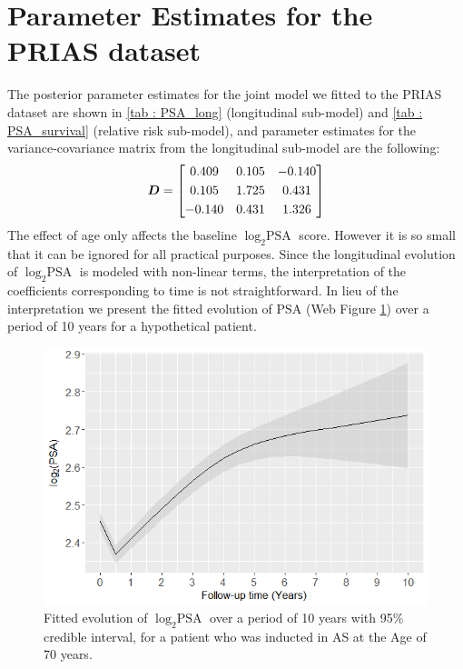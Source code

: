 
\section{Parameter Estimates for the PRIAS dataset}
\label{sec : param_estimates_jm_fit_prias}
The posterior parameter estimates for the joint model we fitted to the PRIAS dataset are shown in \ref{tab : PSA_long} (longitudinal sub-model) and \ref{tab : PSA_survival} (relative risk sub-model), and parameter estimates for the variance-covariance matrix from the longitudinal sub-model are the following:
\begin{equation*}
\boldsymbol{D} = \begin{bmatrix}
       0.409 & 0.105 & -0.140 \\[0.3em]
       0.105 & 1.725 & 0.431 \\[0.3em]
       -0.140 & 0.431 & 1.326
     \end{bmatrix}
\end{equation*} 
The effect of age only affects the baseline $\log_2 \mbox{PSA}$ score. However it is so small that it can be ignored for all practical purposes. Since the longitudinal evolution of $\log_2 \mbox{PSA}$ is modeled with non-linear terms, the interpretation of the coefficients corresponding to time is not straightforward. In lieu of the interpretation we present the fitted evolution of PSA (Web Figure \ref{fig : fitted_trend_psa}) over a period of 10 years for a hypothetical patient.

\begin{figure}[!htb]
\centerline{\includegraphics[width=\columnwidth]{images/fitted_trend_psa.png}}
\caption{Fitted evolution of $\log_2 \mbox{PSA}$ over a period of 10 years with 95\% credible interval, for a patient who was inducted in AS at the Age of 70 years.}
\label{fig : fitted_trend_psa}
\end{figure}

